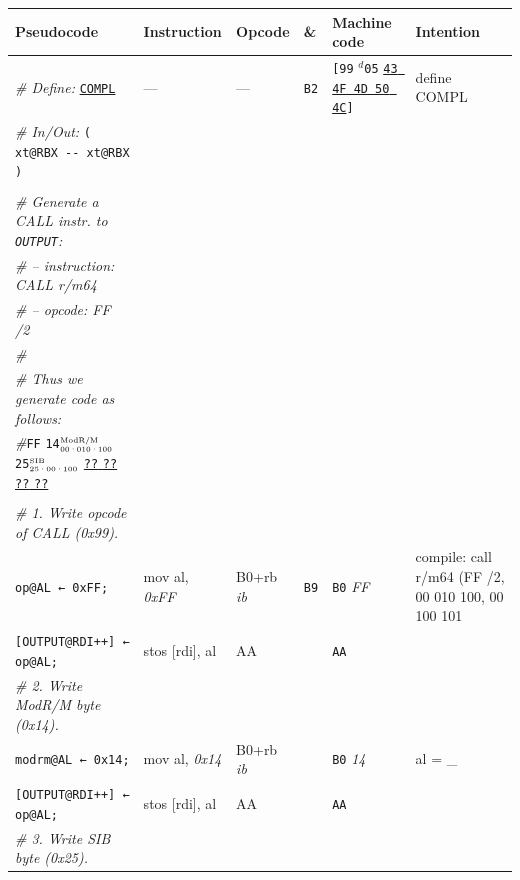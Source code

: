 \documentclass[a4paper,12pt,final]{article}
\begin{document}
\begin{table}[!htbp] \begin{adjustwidth}{-1cm}{-1cm} \fontsize{10}{12.000000}\selectfont
\begin{center}
\begin{tabular}{l|ll|l|lH}
\textbf{Pseudocode} & \textbf{Instruction} & \textbf{Opcode} & \textbf{\&} & \textbf{Machine code} & \textbf{Intention}\\[0pt]
\hline
\emph{\# Define:} \uline{\texttt{COMPL}} & --- & --- & \texttt{B2} & \texttt{[99} \(^{d}\)​\texttt{05} \uline{\texttt{43 4F 4D 50 4C}}​\texttt{]} & define COMPL\\[0pt]
\emph{\# In/Out:} \texttt{( xt@RBX -{}-{} xt@RBX )} &  &  &  &  & \\[0pt]
 &  &  &  &  & \\[0pt]
\emph{\# Generate a CALL instr. to \texttt{OUTPUT}:} &  &  &  &  & \\[0pt]
\emph{\# – instruction: CALL r/m64} &  &  &  &  & \\[0pt]
\emph{\# – opcode: FF /2} &  &  &  &  & \\[0pt]
\emph{\#} &  &  &  &  & \\[0pt]
\emph{\# Thus we generate code as follows:} &  &  &  &  & \\[0pt]
\emph{\#}\hspace{1.053000em}​\texttt{FF} \texttt{14}​\(^{\text{\tiny ModR/M}}_{\text{\tiny 00·010·100}}\) \texttt{25}​\(^{\text{\tiny    SIB}}_{\text{\tiny 25·00·100}}\) \uline{\texttt{??} \texttt{??} \texttt{??} \texttt{??}} &  &  &  &  & \\[0pt]
 &  &  &  &  & \\[0pt]
\emph{\# 1. Write opcode of CALL (0x99).} &  &  &  &  & \\[0pt]
\texttt{op@AL ← 0xFF;} & mov al, \emph{0xFF} & B0+rb \emph{ib} & \texttt{B9} & \texttt{B0} \emph{FF} & compile: call r/m64 (FF /2, 00 010 100, 00 100 101\\[0pt]
\texttt{[OUTPUT@RDI++] ← op@AL;} & stos [rdi], al & AA &  & \texttt{AA} & \\[0pt]
\emph{\# 2. Write ModR/M byte (0x14).} &  &  &  &  & \\[0pt]
\texttt{modrm@AL ← 0x14;} & mov al, \emph{0x14} & B0+rb \emph{ib} &  & \texttt{B0} \emph{14} & al = \_\\[0pt]
\texttt{[OUTPUT@RDI++] ← op@AL;} & stos [rdi], al & AA &  & \texttt{AA} & \\[0pt]
\emph{\# 3. Write SIB byte (0x25).} &  &  &  &  & \\[0pt]

\end{tabular}
\end{center}
\end{adjustwidth}
\end{table}
\end{document}
